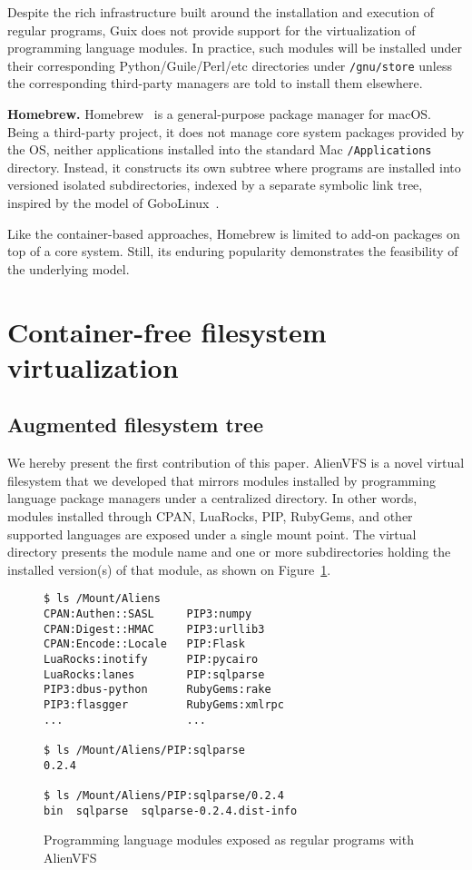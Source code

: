 \documentclass[sigplan, anonymous, 10pt]{acmart}
\begin{document}
Despite the rich infrastructure built around the installation and execution of regular programs,
Guix does not provide support for the virtualization of programming language modules. In practice,
such modules will be installed under their corresponding Python/Guile/Perl/etc directories
under \texttt{/gnu/store} unless the corresponding third-party managers are told to install them
elsewhere.

\textbf{Homebrew.}
Homebrew~\cite{homebrew} is a general-purpose package manager for macOS. Being a third-party project,
it does not manage core system packages provided by the OS, neither applications installed
into the standard Mac \texttt{/Applications} directory. Instead, it constructs its own
subtree where programs are installed into versioned isolated subdirectories, indexed
by a separate symbolic link tree, inspired by the model of
GoboLinux~\cite{howell2009:homebrewgobo}.

Like the container-based approaches, Homebrew is limited to add-on packages on top of
a core system. Still, its enduring popularity demonstrates the feasibility of the
underlying model.

\section{Container-free filesystem virtualization}\label{sec:our_work}

\subsection{Augmented filesystem tree}
We hereby present the first contribution of this paper. AlienVFS is a novel virtual
filesystem that we developed that mirrors modules installed by programming language
package managers under a centralized directory. In other words, modules installed
through CPAN, LuaRocks, PIP, RubyGems, and other supported languages are exposed under
a single mount point. The virtual directory presents the module name and one or more
subdirectories holding the installed version(s) of that module, as shown on
Figure~\ref{fig:alienvfs}.

\begin{figure}
    \begin{Verbatim}[frame=single]
$ ls /Mount/Aliens
CPAN:Authen::SASL     PIP3:numpy
CPAN:Digest::HMAC     PIP3:urllib3
CPAN:Encode::Locale   PIP:Flask
LuaRocks:inotify      PIP:pycairo
LuaRocks:lanes        PIP:sqlparse
PIP3:dbus-python      RubyGems:rake
PIP3:flasgger         RubyGems:xmlrpc
...                   ...

$ ls /Mount/Aliens/PIP:sqlparse
0.2.4

$ ls /Mount/Aliens/PIP:sqlparse/0.2.4
bin  sqlparse  sqlparse-0.2.4.dist-info
    \end{Verbatim}
    \caption{Programming language modules exposed as regular programs with AlienVFS}
    \label{fig:alienvfs}
\end{figure}
\end{document}
